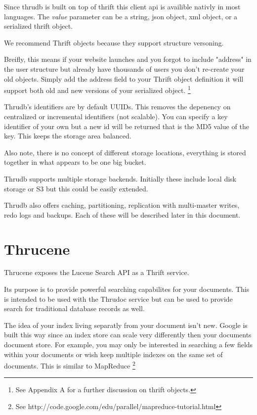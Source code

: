 \documentclass[nocopyrightspace,blockstyle]{sigplanconf}
\begin{document}
Since thrudb is built on top of thrift this client api is availible nativly in most languages.
The \textit{value} parameter can be a string, json object, xml object, or a serialized thrift object.

We recommend Thrift objects because they support structure versoning.  

Breifly, this means if your website launches and you forgot to include "address" in the user 
structure but already have thousands of users you don't re-create your old objects. Simply add the address field
to your Thrift object definition it will support both old and new versions of your serialized object. 
\footnote{See Appendix A for a further discussion on thrift objects.}

Thrudb's identifiers are by default UUIDs. This removes the depenency on centralized or incremental identifiers (not scalable).
You can specify a key identifier of your own but a new id will be returned that is the MD5 value of the key. 
This keeps the storage area balanced. 

Also note, there is no concept of different storage locations, everything is stored together in what appears to be one big bucket.

Thrudb supports multiple storage backends.  Initially these include local disk storage or S3 but this could be easily extended. 

Thrudb also offers caching, partitioning, replication with multi-master writes, redo logs and backups. Each of these 
will be described later in this document.

\section{Thrucene}

Thrucene exposes the Lucene Search API as a Thrift service.  

Its purpose is to provide powerful searching capabilites for your documents.  
This is intended to be used with the Thrudoc service but can be used to provide search for traditional database records as well. 

The idea of your index living separatly from your document isn't new.  
Google is built this way since an index store can scale very differently then your documents document store.  
For example, you may only be interested in searching a few fields within your documents or
wish keep multiple indexes on the same set of documents. This is similar to MapReduce
\footnote{See http://code.google.com/edu/parallel/mapreduce-tutorial.html}
\end{document}
